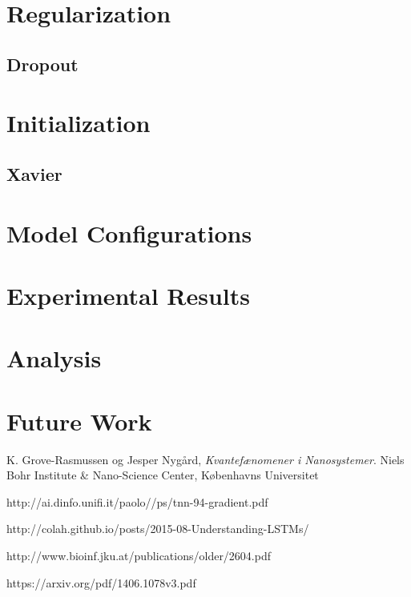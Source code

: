 \documentclass[a4paper]{article}
\begin{document}
\section{Regularization}
\label{sec:regularization}

\subsection{Dropout}
\label{sec:dropout}

\section{Initialization}
\label{sec:initialization}

\subsection{Xavier}
\label{sec:xavier}

\section{Model Configurations}
\label{sec:configuration}

\section{Experimental Results}
\label{sec:results}

\section{Analysis}
\label{sec:analysis}

\section{Future Work}
\label{sec:future}

\begin{thebibliography}{9}
  K. Grove-Rasmussen og Jesper Nygård,
  \emph{Kvantefænomener i Nanosystemer}.
  Niels Bohr Institute \& Nano-Science Center, Københavns Universitet

  http://ai.dinfo.unifi.it/paolo//ps/tnn-94-gradient.pdf

  http://colah.github.io/posts/2015-08-Understanding-LSTMs/

  http://www.bioinf.jku.at/publications/older/2604.pdf

  https://arxiv.org/pdf/1406.1078v3.pdf
\end{thebibliography}
\end{document}
